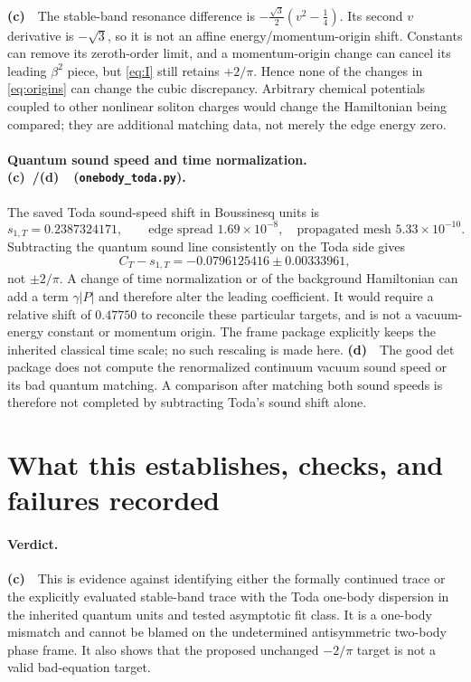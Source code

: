 \documentclass[11pt,a4paper]{article}
\newcommand{\Lc}{\textbf{(c)}\ }
\newcommand{\Ld}{\textbf{(d)}\ }
\newcommand{\TT}{\texttt{onebody\_\allowbreak toda.py}}
\begin{document}
\Lc\ The stable-band resonance difference is
$-\frac{\sqrt3}{2}(v^2-\frac14)$. Its second $v$ derivative is
$-\sqrt3$, so it is not an affine energy/momentum-origin shift.
Constants can remove its zeroth-order limit, and a momentum-origin change
can cancel its leading $\beta^2$ piece, but \eqref{eq:I} still retains
$+2/\pi$. Hence none of the changes in \eqref{eq:origins} can change the
cubic discrepancy. Arbitrary chemical potentials coupled to other
nonlinear soliton charges would change the Hamiltonian being compared;
they are additional matching data, not merely the edge energy zero.

\paragraph{Quantum sound speed and time normalization. \Lc/\Ld\ (\TT).}
The saved Toda sound-speed shift in Boussinesq units is
\begin{equation}
 s_{1,T}=0.2387324171,
 \qquad \text{edge spread }1.69\times10^{-8},\quad
 \text{propagated mesh }5.33\times10^{-10}.
\end{equation}
Subtracting the quantum sound line consistently on the Toda side gives
\begin{equation}
 C_T-s_{1,T}=-0.0796125416\pm0.00333961,
\end{equation}
not $\pm2/\pi$. A change of time normalization or of the background
Hamiltonian can add a term $\gamma |P|$ and therefore alter the leading
coefficient. It would require a relative shift of $0.47750$ to reconcile
these particular targets, and is not a vacuum-energy constant or momentum
origin. The frame package explicitly keeps the inherited classical time
scale; no such rescaling is made here. \Ld\ The good det package does not
compute the renormalized continuum vacuum sound speed or its bad quantum
matching. A comparison after matching both sound speeds is therefore not
completed by subtracting Toda's sound shift alone.

\section{What this establishes, checks, and failures recorded}
\paragraph{Verdict.}
\Lc\ This is evidence against identifying either the formally continued
trace or the explicitly evaluated stable-band trace with the Toda one-body
dispersion in the inherited quantum units and tested asymptotic fit class.
It is a one-body mismatch and cannot be blamed on the undetermined
antisymmetric two-body phase frame. It also shows that the proposed
unchanged $-2/\pi$ target is not a valid bad-equation target.
\end{document}
